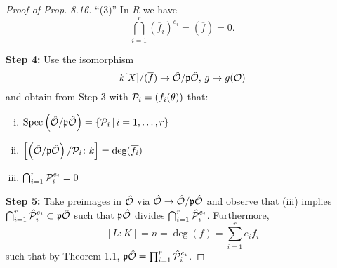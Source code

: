\begin{proof}[Proof of Prop. 8.16]
\bigskip
\enquote{(3)} 
In $R$ we have
\[ \bigcap_{i=1}^r \left( \overline{f}_i \right)^{e_i} 
= \left( \overline{f} \right)
= 0.
\]


\bigskip \textbf{Step 4:}
Use the isomorphism 
\[
 k[X] / (\overline{f})  \to \hat{\mathcal{O}} / \mathfrak{p}\hat{\mathcal{O}}, \, g \mapsto g(\mathcal{O})
 \]
and obtain from Step 3 with $\mathcal{P}_i = \left( f_i(\theta) \right)$ that:
\begin{enumerate}[(i)]
\item $\operatorname{Spec}\left(\hat{\mathcal{O}} / \mathfrak{p}\hat{\mathcal{O}} \right) = \left\{  \mathcal{P}_i \, | \, i = 1, \dots, r  \right\}$
\item $\left[  \left(\hat{\mathcal{O}} / \mathfrak{p}\hat{\mathcal{O}}\right)/  \mathcal{P}_i  \colon k \right] = \deg (\overline{f_i})$
\item  $\bigcap_{i=1}^r \mathcal{P}_i^{e_i} = 0$
\end{enumerate}


\bigskip \textbf{Step 5:}
Take preimages in $\hat{\mathcal{O}}$ via $\hat{\mathcal{O}} \to \hat{\mathcal{O}} / \mathfrak{p}\hat{\mathcal{O}}$
and observe that (iii) implies
$\bigcap_{i=1}^r \hat{\mathcal{P}}_i^{e_i} \subset \mathfrak{p}\hat{\mathcal{O}}$ such that
$\mathfrak{p}\hat{\mathcal{O}}$ divides $\bigcap_{i=1}^r \hat{\mathcal{P}}_i^{e_i}$. Furthermore,
\[ [L:K] = n= \deg(f) = \sum_{i=1}^{r} e_if_i
\]
such that by Theorem 1.1, $\mathfrak{p}\hat{\mathcal{O}} = \prod_{i=1}^r \hat{\mathcal{P}}_i^{e_i}$.
\end{proof}
















